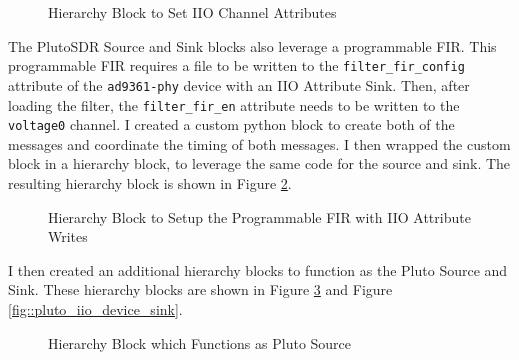 \documentclass{article}
\begin{document}
\begin{figure}[H]
	\centerline{}
	\caption{Hierarchy Block to Set IIO Channel Attributes}
	\label{fig::iio_input_channel_attribute}
\end{figure}

The PlutoSDR Source and Sink blocks also leverage a programmable FIR. This programmable FIR requires a file to be written to the \texttt{filter\_fir\_config} attribute of the \texttt{ad9361-phy} device with an IIO Attribute Sink. Then, after loading the filter, the \texttt{filter\_fir\_en} attribute needs to be written to the \texttt{voltage0} channel. I created a custom python block to create both of the messages and coordinate the timing of both messages. I then wrapped the custom block in a hierarchy block, to leverage the same code for the source and sink. The resulting hierarchy block is shown in Figure \ref{fig::iio_fir_config}.

\begin{figure}[H]
	\centerline{}
	\caption{Hierarchy Block to Setup the Programmable FIR with IIO Attribute Writes}
	\label{fig::iio_fir_config}
\end{figure}

I then created an additional hierarchy blocks to function as the Pluto Source and Sink. These hierarchy blocks are shown in Figure \ref{fig::pluto_iio_device_source} and Figure \ref{fig::pluto_iio_device_sink}.

\begin{figure}[H]
	\centerline{}
	\caption{Hierarchy Block which Functions as Pluto Source}
	\label{fig::pluto_iio_device_source}
\end{figure}
\end{document}
